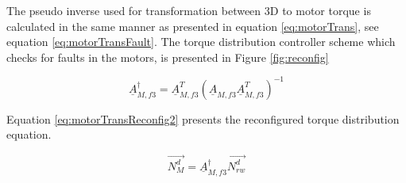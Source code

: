 
The pseudo inverse used for transformation between 3D to motor torque is calculated in the same manner as presented in equation \ref{eq:motorTrans}, see equation \ref{eq:motorTransFault}. The torque distribution controller scheme which checks for faults in the motors, is presented in Figure \ref{fig:reconfig}

\begin{equation}
	\label{eq:motorTransFault}
	\underline{A}_{M,f3}^\dagger   = \underline{A}_{M,f3}^T  (\underline{A}_{M,f3} \underline{A}_{M,f3}^T)^{-1}
\end{equation}
%

Equation \ref{eq:motorTransReconfig2} presents the reconfigured torque distribution equation.

\begin{equation}
\label{eq:motorTransReconfig2}
\vec{N_{M}^d} = \underline{A}_{M,f3}^\dagger \vec{N_{rw}^d}  
\end{equation}





